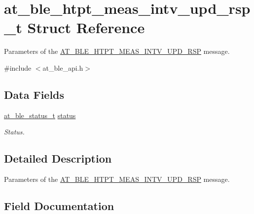 \hypertarget{structat__ble__htpt__meas__intv__upd__rsp__t}{}\section{at\+\_\+ble\+\_\+htpt\+\_\+meas\+\_\+intv\+\_\+upd\+\_\+rsp\+\_\+t Struct Reference}
\label{structat__ble__htpt__meas__intv__upd__rsp__t}


Parameters of the \mbox{\hyperlink{at__ble__api_8h_a3324640b95f33169515f89738ed5baeba01220ffe1802556ff06810793137b97a}{A\+T\+\_\+\+B\+L\+E\+\_\+\+H\+T\+P\+T\+\_\+\+M\+E\+A\+S\+\_\+\+I\+N\+T\+V\+\_\+\+U\+P\+D\+\_\+\+R\+SP}} message.  




{\ttfamily \#include $<$at\+\_\+ble\+\_\+api.\+h$>$}

\subsection*{Data Fields}
\begin{DoxyCompactItemize}
\item 
\mbox{\hyperlink{group__error__codes__group_ga3b1db9b95feb157b3c188ca27fe76988}{at\+\_\+ble\+\_\+status\+\_\+t}} \mbox{\hyperlink{structat__ble__htpt__meas__intv__upd__rsp__t_a0b48093fc2030779fc47e5216f8019e2}{status}}
\begin{DoxyCompactList}\small\item\em Status. \end{DoxyCompactList}\end{DoxyCompactItemize}


\subsection{Detailed Description}
Parameters of the \mbox{\hyperlink{at__ble__api_8h_a3324640b95f33169515f89738ed5baeba01220ffe1802556ff06810793137b97a}{A\+T\+\_\+\+B\+L\+E\+\_\+\+H\+T\+P\+T\+\_\+\+M\+E\+A\+S\+\_\+\+I\+N\+T\+V\+\_\+\+U\+P\+D\+\_\+\+R\+SP}} message. 

\subsection{Field Documentation}
\mbox{\label{structat__ble__htpt__meas__intv__upd__rsp__t_a0b48093fc2030779fc47e5216f8019e2}} 
